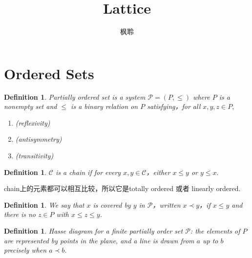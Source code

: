\documentclass{article}
\newtheorem{definition}[theorem]{Definition}
\begin{document}
\title{Lattice}
\author{枫聆}
\maketitle
\tableofcontents

\newpage
\section{Ordered Sets}

\begin{definition}
\rm {\color{red} Partially ordered set} is a system $\mathcal{P} = (P,\leq)$ where $P$ is a nonempty set and $\leq$ is a binary relation on $P$ satisfying，for all $x,y,z \in P,$
\begin{enumerate}
	\item \rm { (reflexivity) }
	\item \rm { (antisymmetry)}
	\item \rm { (transitivity)} 
\end{enumerate}
\end{definition}

\begin{definition}
\rm $\mathcal{C}$ is a {\color{red} chain} if for every $x,y \in \mathcal{C}$，either $x \leq y$ or $y \leq x.$
\end{definition}

{\color{blue} chain上的元素都可以相互比较，所以它是totally ordered 或者 linearly ordered}.

\begin{definition}
\rm We say that $x$ is {\color{red} covered} by $y$ in $\mathcal{P}$，written $x \prec y$，if $x \leq y$ and there is no $z \in P$ with $x \leq z \leq y$.
\end{definition}

\begin{definition}
\rm {\color{red} Hasse diagram} for a finite partially order set $\mathcal{P}$: the elements of $P$ are represented by points in the plane, and a line is drawn from $a$ up to $b$ precisely when $a \prec b$.
\end{definition}
\end{document}
